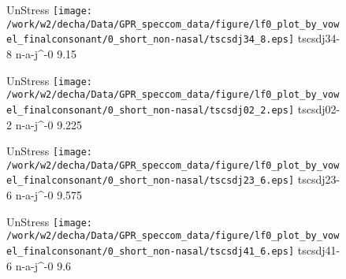 \documentclass{article}
\begin{document}
\begin{figure}[t]
\begin{minipage}[b]{.24\textwidth}
UnStress
\centering
\texttt{[image: /work/w2/decha/Data/GPR\_speccom\_data/figure/lf0\_plot\_by\_vowel\_finalconsonant/0\_short\_non-nasal/tscsdj34\_8.eps]}
tscsdj34-8 n-a-j\textasciicircum-0 9.15
\end{minipage}
\begin{minipage}[b]{.24\textwidth}
UnStress
\centering
\texttt{[image: /work/w2/decha/Data/GPR\_speccom\_data/figure/lf0\_plot\_by\_vowel\_finalconsonant/0\_short\_non-nasal/tscsdj02\_2.eps]}
tscsdj02-2 n-a-j\textasciicircum-0 9.225
\end{minipage}
\begin{minipage}[b]{.24\textwidth}
UnStress
\centering
\texttt{[image: /work/w2/decha/Data/GPR\_speccom\_data/figure/lf0\_plot\_by\_vowel\_finalconsonant/0\_short\_non-nasal/tscsdj23\_6.eps]}
tscsdj23-6 n-a-j\textasciicircum-0 9.575
\end{minipage}
\begin{minipage}[b]{.24\textwidth}
UnStress
\centering
\texttt{[image: /work/w2/decha/Data/GPR\_speccom\_data/figure/lf0\_plot\_by\_vowel\_finalconsonant/0\_short\_non-nasal/tscsdj41\_6.eps]}
tscsdj41-6 n-a-j\textasciicircum-0 9.6
\end{minipage}
\end{figure}
\end{document}
